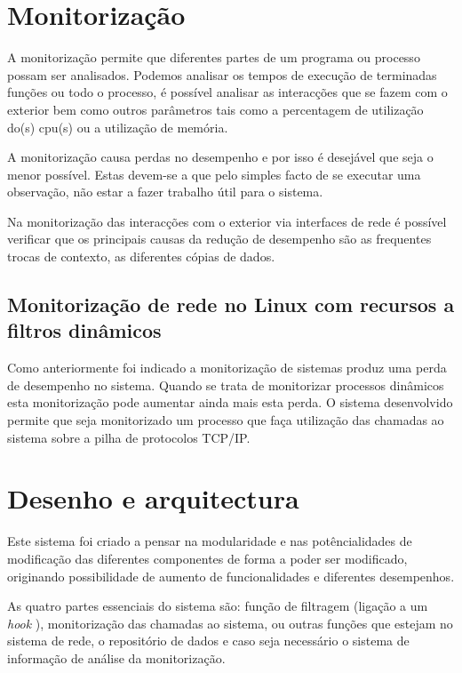 \documentclass[runningheads,a4paper]{llncs}
\begin{document}
\section{Monitorização}
\label{sec:mon_intro}


A monitorização permite que diferentes partes de um programa ou processo possam ser analisados. Podemos analisar os tempos de execução de terminadas funções ou todo o processo, é possível analisar as interacções que se fazem com o exterior bem como outros parâmetros tais como a percentagem de utilização do(s) cpu(s) ou a utilização de memória.

A monitorização causa perdas no desempenho e por isso é desejável que seja o menor possível. Estas devem-se a que pelo simples facto de se executar uma observação, não estar a fazer trabalho útil para o sistema.

Na monitorização das interacções com o exterior via interfaces de rede é possível verificar que os principais causas da redução de desempenho são as frequentes trocas de contexto, as diferentes cópias de dados.


\subsection{Monitorização de rede no Linux com recursos a filtros dinâmicos}
\label{sub:mon_network__with_dynamic_filters_linux}

Como anteriormente foi indicado a monitorização de sistemas produz uma perda de desempenho no sistema. Quando se trata de monitorizar processos dinâmicos esta monitorização pode aumentar ainda mais esta perda. O sistema desenvolvido permite que seja monitorizado um processo que faça utilização das chamadas ao sistema sobre a pilha de protocolos TCP/IP.


\section{Desenho e arquitectura}
\label{sec:architecture}

Este sistema foi criado a pensar na modularidade e nas potêncialidades de modificação das diferentes componentes de forma a poder ser modificado, originando possibilidade de aumento de funcionalidades e diferentes desempenhos.

As quatro partes essenciais do sistema são: função de filtragem (ligação a um \textit{hook} ), monitorização das chamadas ao sistema, ou outras funções que estejam no sistema de rede, o repositório de dados e caso seja necessário o sistema de informação de análise da monitorização.
\end{document}
